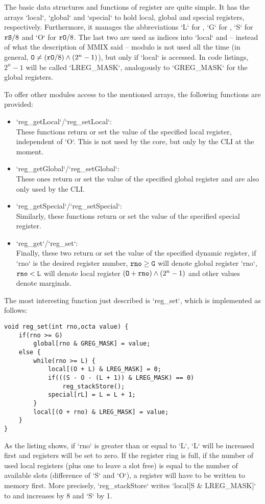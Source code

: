 The basic data structures and functions of register are quite simple. It has the arrays `local`, `global` and `special` to hold local, global and special registers, respectively. Furthermore, it manages the abbreviations `L` for , `G` for , `S` for ${\tt rS}/8$ and `O` for ${\tt rO}/8$. The last two are used as indices into `local` and -- instead of what the description of MMIX said -- modulo is not used all the time (\ie in general, ${\tt O} \ne ({\tt rO}/8) \land (2^n-1)$), but only if `local` is accessed. In code listings, $2^n-1$ will be called `LREG_MASK`, analogously to `GREG_MASK` for the global registers.

To offer other modules access to the mentioned arrays, the following functions are provided:
\begin{itemize}
	\item `reg_getLocal`/`reg_setLocal`:\\
	These functions return or set the value of the specified local register, independent of `O`. This is not used by the core, but only by the CLI at the moment.
	\item `reg_getGlobal`/`reg_setGlobal`:\\
	These ones return or set the value of the specified global register and are also only used by the CLI.
	\item `reg_getSpecial`/`reg_setSpecial`:\\
	Similarly, these functions return or set the value of the specified special register.
	\item `reg_get`/`reg_set`:\\
	Finally, these two return or set the value of the specified dynamic register, \ie if `rno` is the desired register number, ${\tt rno} \ge {\tt G}$ will denote global register `rno`, ${\tt rno} < {\tt L}$ will denote local register $({\tt O}+{\tt rno}) \land (2^n-1)$ and other values denote marginals.
\end{itemize}
The most interesting function just described is `reg_set`, which is implemented as follows:
\begin{lstlisting}[language=GIMMIXC,caption=Implementation of {\tt reg\_set}]
void reg_set(int rno,octa value) {
	if(rno >= G)
		global[rno & GREG_MASK] = value;
	else {
		while(rno >= L) {
			local[(O + L) & LREG_MASK] = 0;
			if(((S - O - (L + 1)) & LREG_MASK) == 0)
				reg_stackStore();
			special[rL] = L = L + 1;
		}
		local[(O + rno) & LREG_MASK] = value;
	}
}
\end{lstlisting}
As the listing shows, if `rno` is greater than or equal to `L`, `L` will be increased first and registers will be set to zero. If the register ring is full, \ie if the number of used local registers (plus one to leave a slot free) is equal to the number of available slots (difference of `S` and `O`), a register will have to be written to memory first. More precisely, `reg_stackStore` writes `local[S & LREG_MASK]` to  and increases  by 8 and `S` by 1.

